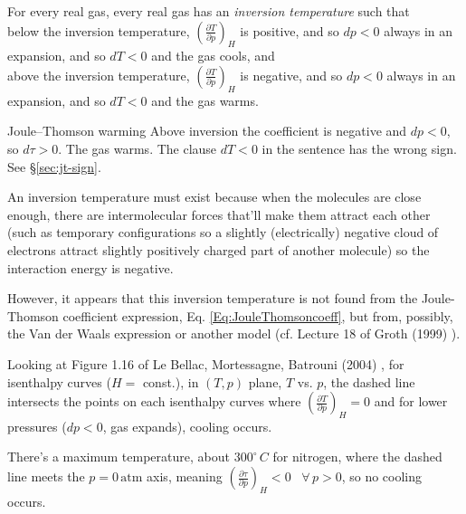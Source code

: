 For every real gas, every real gas has an \emph{inversion temperature} such that \\
below the inversion temperature, $\left( \frac{ \partial T}{ \partial p} \right)_H$ is positive, and so $dp <0$ always in an expansion, and so $dT <0$ and the gas cools, and \\
above the inversion temperature, $\left( \frac{ \partial T}{ \partial p} \right)_H$ is negative, and so $dp <0$ always in an expansion, and so $dT <0$ and the gas warms.
\begin{correction}{Joule--Thomson warming}
Above inversion the coefficient is negative and $dp<0$, so $d\tau>0$.
The gas warms.
The clause $dT<0$ in the sentence has the wrong sign.
See \S\ref{sec:jt-sign}.
\end{correction}  

An inversion temperature must exist because when the molecules are close enough, there are intermolecular forces that'll make them attract each other (such as temporary configurations so a slightly (electrically) negative cloud of electrons attract slightly positively charged part of another molecule) so the interaction energy is negative.  

However, it appears that this inversion temperature is not found from the Joule-Thomson coefficient expression, Eq. \ref{Eq:JouleThomsoncoeff}, but from, possibly, the Van der Waals expression or another model (cf. Lecture 18 of Groth (1999) \cite{EGroth1999}).  

Looking at Figure 1.16 of  Le Bellac, Mortessagne, Batrouni (2004) \cite{MLeBellacFMortessagneGBatrouni2004}, for isenthalpy curves ($H=$ const.), in $(T,p)$ plane, $T$ vs. $p$, the dashed line intersects the points on each isenthalpy curves where $\left( \frac{ \partial T}{ \partial p } \right)_H =0$ and for lower pressures ($dp<0$, gas expands), cooling occurs.  

There's a maximum temperature, about $300^{\circ} \, C$ for nitrogen, where the dashed line meets the $p=0 \, \text{atm}$ axis, meaning $\left( \frac{ \partial \tau}{ \partial p} \right)_H <0$ \, $\forall \, p >0$, so no cooling occurs.  

